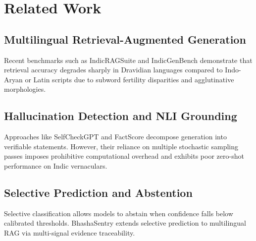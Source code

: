 \section{Related Work}
\subsection{Multilingual Retrieval-Augmented Generation}
Recent benchmarks such as IndicRAGSuite and IndicGenBench demonstrate that retrieval accuracy degrades sharply in Dravidian languages compared to Indo-Aryan or Latin scripts due to subword fertility disparities and agglutinative morphologies.

\subsection{Hallucination Detection and NLI Grounding}
Approaches like SelfCheckGPT and FactScore decompose generation into verifiable statements. However, their reliance on multiple stochastic sampling passes imposes prohibitive computational overhead and exhibits poor zero-shot performance on Indic vernaculars.

\subsection{Selective Prediction and Abstention}
Selective classification allows models to abstain when confidence falls below calibrated thresholds. BhashaSentry extends selective prediction to multilingual RAG via multi-signal evidence traceability.
